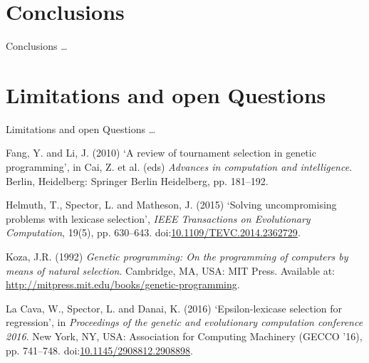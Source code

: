 \documentclass[
  ignorenonframetext,
]{beamer}
\newenvironment{cslreferences}%
  {}%
  {\par}
\begin{document}
\hypertarget{conclusions}{%
\section{Conclusions}\label{conclusions}}

\begin{frame}{Conclusions}
\ldots{}
\end{frame}

\hypertarget{limitations-and-open-questions}{%
\section{Limitations and open
Questions}\label{limitations-and-open-questions}}

\begin{frame}{Limitations and open Questions}
\ldots{} \newpage  

\hypertarget{refs}{}
\begin{cslreferences}
\leavevmode\hypertarget{ref-10.1007ux2f978-3-642-16493-4_19}{}%
Fang, Y. and Li, J. (2010) `A review of tournament selection in genetic
programming', in Cai, Z. et al. (eds) \emph{Advances in computation and
intelligence}. Berlin, Heidelberg: Springer Berlin Heidelberg, pp.
181--192.

\leavevmode\hypertarget{ref-6920034}{}%
Helmuth, T., Spector, L. and Matheson, J. (2015) `Solving uncompromising
problems with lexicase selection', \emph{IEEE Transactions on
Evolutionary Computation}, 19(5), pp. 630--643.
doi:\href{https://doi.org/10.1109/TEVC.2014.2362729}{10.1109/TEVC.2014.2362729}.

\leavevmode\hypertarget{ref-koza_main}{}%
Koza, J.R. (1992) \emph{Genetic programming: On the programming of
computers by means of natural selection}. Cambridge, MA, USA: MIT Press.
Available at: \url{http://mitpress.mit.edu/books/genetic-programming}.

\leavevmode\hypertarget{ref-epsilon_lexicase_main}{}%
La Cava, W., Spector, L. and Danai, K. (2016) `Epsilon-lexicase
selection for regression', in \emph{Proceedings of the genetic and
evolutionary computation conference 2016}. New York, NY, USA:
Association for Computing Machinery (GECCO '16), pp. 741--748.
doi:\href{https://doi.org/10.1145/2908812.2908898}{10.1145/2908812.2908898}.
\end{cslreferences}
\end{frame}
\end{document}
